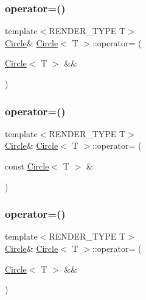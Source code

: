 \mbox{\label{classCircle_a06c8a2624fa51b38023e0326e8ccf789}} 
\subsubsection{\texorpdfstring{operator=()}{operator=()}\hspace{0.1cm}{\footnotesize\ttfamily [1/4]}}
{\footnotesize\ttfamily template$<$R\+E\+N\+D\+E\+R\+\_\+\+T\+Y\+PE T$>$ \\
\mbox{\hyperlink{classCircle}{Circle}}\& \mbox{\hyperlink{classCircle}{Circle}}$<$ T $>$\+::operator= (\begin{DoxyParamCaption}\item[{\mbox{\hyperlink{classCircle}{Circle}}$<$ T $>$ \&\&}]{ }\end{DoxyParamCaption})\hspace{0.3cm}{\ttfamily [default]}}

\mbox{\label{classCircle_a0e3ef62951a8fccaf0635ea21ae73eca}} 
\subsubsection{\texorpdfstring{operator=()}{operator=()}\hspace{0.1cm}{\footnotesize\ttfamily [2/4]}}
{\footnotesize\ttfamily template$<$R\+E\+N\+D\+E\+R\+\_\+\+T\+Y\+PE T$>$ \\
\mbox{\hyperlink{classCircle}{Circle}}\& \mbox{\hyperlink{classCircle}{Circle}}$<$ T $>$\+::operator= (\begin{DoxyParamCaption}\item[{const \mbox{\hyperlink{classCircle}{Circle}}$<$ T $>$ \&}]{ }\end{DoxyParamCaption})\hspace{0.3cm}{\ttfamily [default]}}

\mbox{\label{classCircle_a06c8a2624fa51b38023e0326e8ccf789}} 
\subsubsection{\texorpdfstring{operator=()}{operator=()}\hspace{0.1cm}{\footnotesize\ttfamily [3/4]}}
{\footnotesize\ttfamily template$<$R\+E\+N\+D\+E\+R\+\_\+\+T\+Y\+PE T$>$ \\
\mbox{\hyperlink{classCircle}{Circle}}\& \mbox{\hyperlink{classCircle}{Circle}}$<$ T $>$\+::operator= (\begin{DoxyParamCaption}\item[{\mbox{\hyperlink{classCircle}{Circle}}$<$ T $>$ \&\&}]{ }\end{DoxyParamCaption})\hspace{0.3cm}{\ttfamily [default]}}

